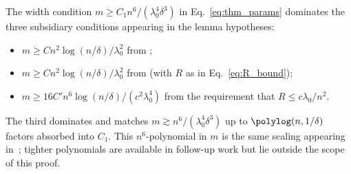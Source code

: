 \begin{remark}\label{rem:width_check}
The width condition $m \ge C_1 n^6 / (\lambda_0^4 \delta^3)$ in Eq.~\eqref{eq:thm_params} dominates the three subsidiary conditions appearing in the lemma hypotheses:
\begin{itemize}[leftmargin=2em, itemsep=0.2em]
\item $m \ge C n^2 \log(n/\delta) / \lambda_0^2$ from ;
\item $m \ge C n^2 \log(n/\delta) / \lambda_0^2$ from  (with $R$ as in Eq.~\eqref{eq:R_bound});
\item $m \ge 16 C' n^6 \log(n/\delta) / (c^2 \lambda_0^4)$ from the requirement that $R \le c \lambda_0 / n^2$.
\end{itemize}
The third dominates and matches $m \gtrsim n^6 / (\lambda_0^4 \delta^3)$ up to $\polylog(n, 1/\delta)$ factors absorbed into $C_1$. This $n^6$-polynomial in $m$ is the same scaling appearing in~\cite{du2019gradient}; tighter polynomials are available in follow-up work but lie outside the scope of this proof.
\end{remark}
